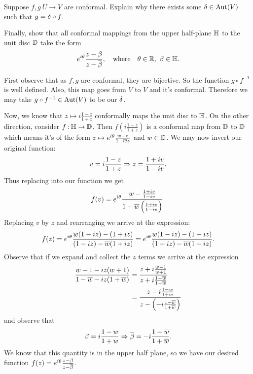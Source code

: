 \documentclass[12pt]{memoir}
\begin{document}
\begin{Ej}
    Suppose $f,g\: U\to V$ are conformal. Explain why there exists some $\delta\in\operatorname{Aut}(V)$ such that $g=\delta\circ f$.\par 
    Finally, show that all conformal mappings from the upper half-plane $\mathbb{H}$ to the unit disc $\mathbb{D}$ take the form
    $$e^{i\te}\frac{z-\bt}{z-\ov{\bt}},\word{where}\te\in\bR,\ \bt\in\bH.$$
\end{Ej}

\begin{ptcbr}
    First observe that as $f,g$ are conformal, they are bijective. So the function $g\circ f^{-1}$ is well defined. Also, this map goes from $V$ to $V$ and it's conformal. Therefore we may take $g\circ f^{-1}\in\operatorname{Aut}(V)$ to be our $\delta$.\par 
    Now, we know that $z\mapsto i\frac{1-z}{1+z}$ conformally maps the unit disc to $\mathbb{H}$. On the other direction, consider $f\mathbin{:} \mathbb{H}\to\mathbb{D}$. Then $f\left(i\frac{1-z}{1+z}\right)$ is a conformal map from $\mathbb{D}$ to $\mathbb{D}$ which means it's of the form $z\mapsto e^{i\theta}\frac{w-z}{1-\overline wz}$ and $w\in\mathbb{D}$. We may now invert our original function:
    $$v=i\frac{1-z}{1+z}\Rightarrow z=\frac{1+iv}{1-iv}.$$
    Thus replacing into our function we get 
    $$f(v)=e^{i\theta}\frac{w-\frac{1+iv}{1-iv}}{1-\overline w\left(\frac{1+iv}{1-iv}\right)}.$$
    Replacing $v$ by $z$ and rearranging we arrive at the expression:
    $$f(z)=e^{i\theta}\frac{w(1-iz)-(1+iz)}{(1-iz)-\overline{w}(1+iz)}=e^{i\theta}\frac{w(1-iz)-(1+iz)}{(1-iz)-\overline{w}(1+iz)}.$$
    Observe that if we expand and collect the $z$ terms we arrive at the expression 
    \begin{align*}
    \frac{w-1-iz(w+1)}{1-\overline w-iz(1+\overline w)}&=\frac{z+i\frac{w-1}{w+1}}{z+i\frac{1-\overline w}{1+\overline w}}\\
    &=\frac{z-i\frac{1-w}{1+w}}{z-\left(-i\frac{1-\overline w}{1+\overline w}\right)}
\end{align*}
and observe that 
$$\beta=i\frac{1-w}{1+w}\Rightarrow\overline{\beta}=-i\frac{1-\overline w}{1+\overline w}.$$
We know that this quantity is in the upper half plane, so we have our desired function $f(z)=e^{i\theta}\frac{z-\beta}{z-\overline{\beta}}$.
\end{ptcbr}
\end{document}
